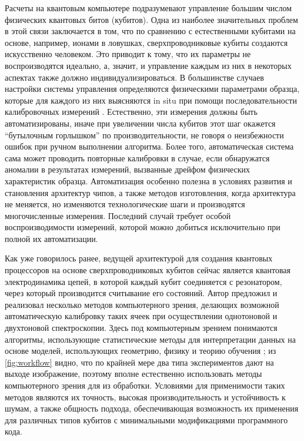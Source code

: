 \documentclass[14pt, a4paper]{extreport}
\numberwithin{equation}{section}
\begin{document}
Расчеты на квантовым компьютере подразумевают управление большим числом физических квантовых битов (кубитов). Одна из наиболее значительных проблем в этой связи заключается в том, что по сравнению с естественными кубитами на основе, например, ионами в ловушках, сверхпроводниковые кубиты создаются искусственно человеком. Это приводит к тому, что их параметры не воспроизводятся идеально, а, значит, и управление каждым из них в некоторых аспектах также должно индивидуализироваться. В большинстве случаев настройки системы управления определяются физическими параметрами образца, которые для каждого из них выясняются in situ при помощи последовательности калибровочных измерений \cite{kelly2018physical, chen2018metrology, fedorov2019automated}. Естественно, эти измерения должны быть автоматизированы, иначе при увеличении числа кубитов этот шаг окажется ``бутылочным горлышком'' по производительности, не говоря о неизбежности ошибок при ручном выполнении алгоритма. Более того, автоматическая система сама может проводить повторные калибровки в случае, если обнаружатся аномалии в результатах измерений, вызванные дрейфом физических характеристик образца. Автоматизация особенно полезна в условиях развития и становления архитектур чипов, а также методов изготовления, когда архитектура не меняется, но изменяются технологические шаги и производятся многочисленные измерения. Последний случай требует особой воспроизводимости измерений, которой можно добиться исключительно при полной их автоматизации.

Как уже говорилось ранее, ведущей архитектурой для создания квантовых процессоров на основе сверхпроводниковых кубитов сейчас является квантовая электродинамика цепей, в которой каждый кубит соединяется с резонатором, через который производится считывание его состояний. Автор предложил и реализовал несколько методов компьютерного зрения, делающих возможной автоматическую калибровку таких ячеек при осуществлении однотоновой и двухтоновой спектроскопии. Здесь под компьютерным зрением понимаются алгоритмы, использующие статистические методы для интерпретации данных на основе моделей, использующих геометрию, физику и теорию обучения \cite{forsyth2012computer}; из \autoref{fig:workflow} видно, что по крайней мере два типа экспериментов дают на выходе изображение, поэтому вполне естественно использовать методы компьютерного зрения для из обработки. Условиями для применимости таких методов являются их точность, высокая производительность и устойчивость к шумам, а также общность подхода, обеспечивающая возможность их применения для различных типов кубитов с минимальными модификациями программного кода.
\end{document}
